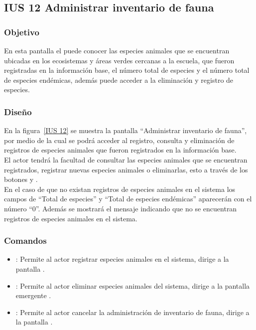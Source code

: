 \subsection{IUS 12 Administrar inventario de fauna}

\subsubsection{Objetivo}

    En esta pantalla el  puede conocer las especies animales que se encuentran ubicadas en los ecosistemas y áreas verdes cercanas a la escuela, que fueron registradas en la información base, el número total de especies y el número total de especies endémicas, además puede acceder a la eliminación y registro de especies.

\subsubsection{Diseño}

    En la figura~\ref{IUS 12} se muestra la pantalla ``Administrar inventario de fauna'', por medio de la cual se podrá acceder al registro, consulta y eliminación de registros de especies animales que fueron registrados en la información base.\\
    
    El actor tendrá la facultad de consultar las especies animales que se encuentran registrados, registrar nuevas especies animales o eliminarlas, esto a través de los botones  y \botKo.\\
    
    En el caso de que no existan registros de especies animales en el sistema los campos de ``Total de especies'' y ``Total de especies endémicas'' aparecerán con el número ``0''. Además se mostrará el mensaje  indicando que no se encuentran registros de especies animales en el sistema.



\subsubsection{Comandos}
    \begin{itemize}
    \item {}: Permite al actor registrar especies animales en el sistema, dirige a la pantalla .
    
    \item \botKo[Eliminar]: Permite al actor eliminar especies animales del sistema, dirige a la pantalla emergente .
    
    \item {}: Permite al actor cancelar la administración de inventario de fauna, dirige a la pantalla .
    \end{itemize}

